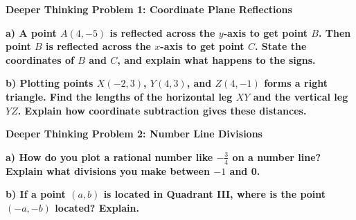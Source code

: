 \documentclass[12pt, letterpaper, fleqn]{article}
\begin{document}
\begin{tcolorbox}[colback=black!5, colframe=black!50, boxrule=1pt, arc=4mm, left=6mm, right=6mm, top=5mm, bottom=5mm]
\textbf{Deeper Thinking Problem 1: Coordinate Plane Reflections}

\medskip

\noindent
\textbf{a) A point $A(4, -5)$ is reflected across the $y$-axis to get point $B$. Then point $B$ is reflected across the $x$-axis to get point $C$. State the coordinates of $B$ and $C$, and explain what happens to the signs.}

\vspace{2cm}

\noindent
\textbf{b) Plotting points $X(-2, 3)$, $Y(4, 3)$, and $Z(4, -1)$ forms a right triangle. Find the lengths of the horizontal leg $XY$ and the vertical leg $YZ$. Explain how coordinate subtraction gives these distances.}

\vspace{2cm}
\end{tcolorbox}
\newpage

\begin{tcolorbox}[colback=black!5, colframe=black!50, boxrule=1pt, arc=4mm, left=6mm, right=6mm, top=5mm, bottom=5mm]
\textbf{Deeper Thinking Problem 2: Number Line Divisions}

\medskip

\noindent
\textbf{a) How do you plot a rational number like $-\frac{3}{4}$ on a number line? Explain what divisions you make between $-1$ and 0.}

\vspace{2cm}

\noindent
\textbf{b) If a point $(a, b)$ is located in Quadrant III, where is the point $(-a, -b)$ located? Explain.}

\vspace{2cm}
\end{tcolorbox}
\newpage
\end{document}
